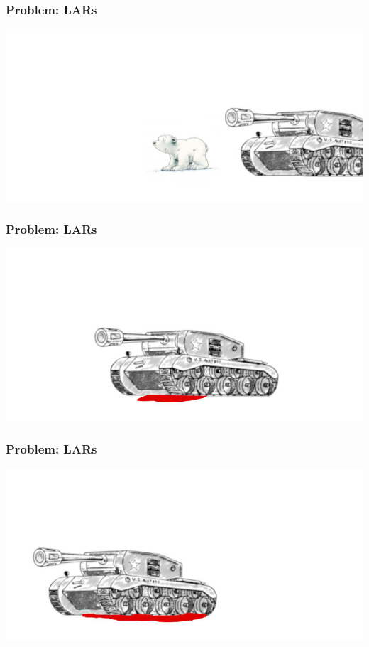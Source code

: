 \documentclass[aspectratio=169,x11names]{beamer}
\begin{document}
\begin{frame}
\frametitle{Problem: LARs}

\begin{center}
\includegraphics[width=1.067\textwidth]{images/lars3.jpg} 
\end{center}
\end{frame}


\begin{frame}
\frametitle{Problem: LARs}

\begin{center}
\includegraphics[width=1.067\textwidth]{images/lars4.jpg} 
\end{center}
\end{frame}


\begin{frame}
\frametitle{Problem: LARs}

\begin{center}
\includegraphics[width=1.067\textwidth]{images/lars5.jpg} 
\end{center}
\end{frame}
\end{document}
